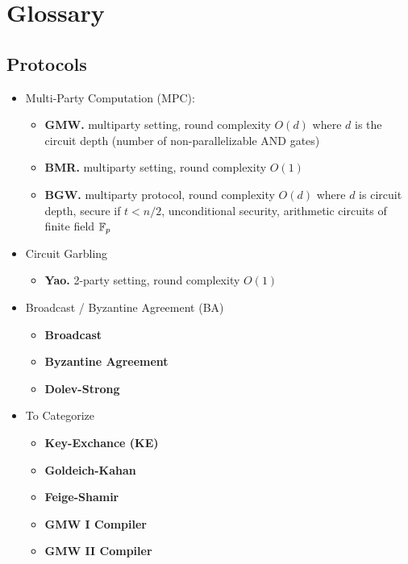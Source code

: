 \section{Glossary}

\subsection{Protocols}

\begin{itemize}

\item Multi-Party Computation (MPC):
\begin{itemize}
\item \textbf{GMW.}
    multiparty setting,
    round complexity $O(d)$ where $d$ is the circuit depth (number of non-parallelizable AND gates)
\item \textbf{BMR.}
    multiparty setting,
    round complexity $O(1)$
\item \textbf{BGW.}
    multiparty protocol,
    round complexity $O(d)$ where $d$ is circuit depth,
    secure if $t < n/2$,
    unconditional security,
    arithmetic circuits of finite field $\mathbb{F}_p$
\end{itemize}

\item Circuit Garbling
\begin{itemize}
\item \textbf{Yao.}
    2-party setting,
    round complexity $O(1)$
\end{itemize}

\item Broadcast / Byzantine Agreement (BA)
\begin{itemize}
\item \textbf{Broadcast}
\item \textbf{Byzantine Agreement}
\item \textbf{Dolev-Strong}
\end{itemize}

\item To Categorize
\begin{itemize}
\item \textbf{Key-Exchance (KE)}
\item \textbf{Goldeich-Kahan}
\item \textbf{Feige-Shamir}
\item \textbf{GMW I Compiler}
\item \textbf{GMW II Compiler}

\end{itemize}

\end{itemize}
